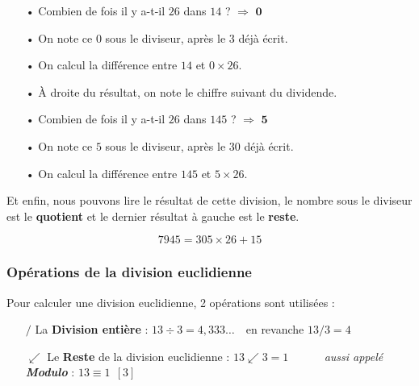 \documentclass[a4paper, twoside]{article}
\begin{document}
				\begin{itemize}
				
				\item[•] Combien de fois il y a-t-il $26$ dans $14$ ? $\Longrightarrow$ $\mathbf{0}$
				\item[•] On note ce $\mathit{0}$ sous le diviseur, après le $\mathit{3}$ déjà écrit.
				\item[•] On calcul la différence entre $14$ et $0\times26$.
				\item[•] À droite du résultat, on note le chiffre suivant du dividende.
				\vspace{2 mm}
				\item[•] Combien de fois il y a-t-il $26$ dans $145$ ? $\Longrightarrow$ $\mathbf{5}$
				\item[•] On note ce $\mathit{5}$ sous le diviseur, après le $\mathit{30}$ déjà écrit.
				\item[•] On calcul la différence entre $145$ et $5\times26$.
				
				\end{itemize}

			\vspace{2 mm}

			Et enfin, nous pouvons lire le résultat de cette division, 
			le nombre sous le diviseur est le \textbf{quotient} et 
			le dernier résultat à gauche est le \textbf{reste}.\\

			\vspace{-6 mm}

			{\large $$7945 = 305 \times 26 + 15 $$ }

			\vfill

			\subsubsection*{Opérations de la division euclidienne}

			Pour calculer une division euclidienne, 2 opérations sont utilisées :

				\vspace{2 mm}

				\begin{itemize}
				
				\item[$/$] La \textbf{Division entière} : $13\div3 = 4,333\dots ~~~ $ en revanche $13/3 = 4$
				\item[$\swarrow$] Le \textbf{Reste} de la division euclidienne : $13 \swarrow 3 = 1$ ~~~~~ \textit{aussi appelé \textbf{Modulo}} : $13 \equiv 1 ~~ [3]$
				
				\end{itemize}
\end{document}
